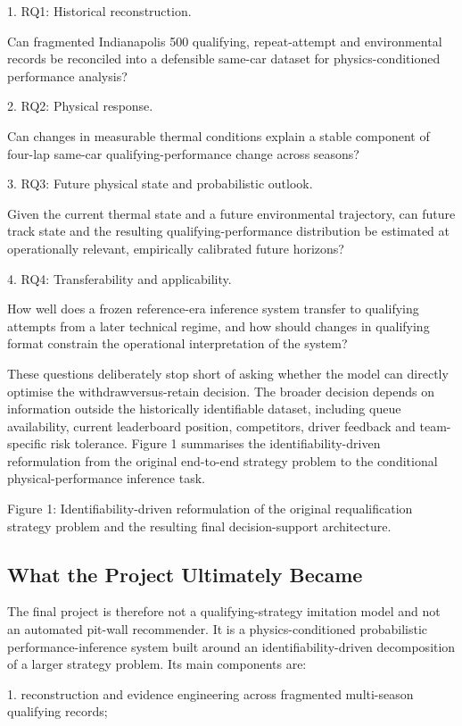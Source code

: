 1. RQ1: Historical reconstruction.

Can fragmented Indianapolis 500 qualifying, repeat-attempt and environmental records be reconciled into a defensible same-car dataset for physics-conditioned performance analysis?

2. RQ2: Physical response.

Can changes in measurable thermal conditions explain a stable component of four-lap same-car qualifying-performance change across seasons?

3. RQ3: Future physical state and probabilistic outlook.

Given the current thermal state and a future environmental trajectory, can future track state and the resulting qualifying-performance distribution be estimated at operationally relevant, empirically calibrated future horizons?

4. RQ4: Transferability and applicability.

How well does a frozen reference-era inference system transfer to qualifying attempts from a later technical regime, and how should changes in qualifying format constrain the operational interpretation of the system?

These questions deliberately stop short of asking whether the model can directly optimise the withdrawversus-retain decision. The broader decision depends on information outside the historically identifiable dataset, including queue availability, current leaderboard position, competitors, driver feedback and team-specific risk tolerance. Figure 1 summarises the identifiability-driven reformulation from the original end-to-end strategy problem to the conditional physical-performance inference task.

Figure 1: Identifiability-driven reformulation of the original requalification strategy problem and the resulting final decision-support architecture.

\subsection{What the Project Ultimately Became}
The final project is therefore not a qualifying-strategy imitation model and not an automated pit-wall recommender. It is a physics-conditioned probabilistic performance-inference system built around an identifiability-driven decomposition of a larger strategy problem. Its main components are:

1. reconstruction and evidence engineering across fragmented multi-season qualifying records;

